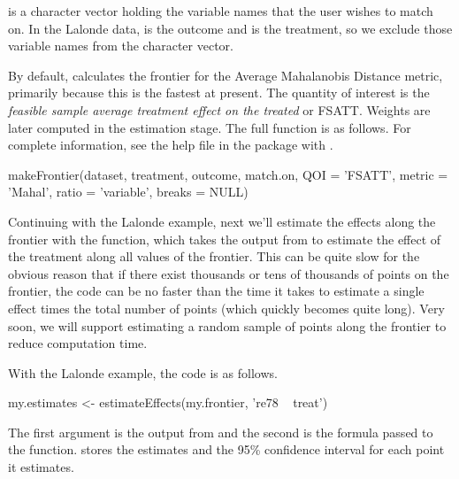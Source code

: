 \documentclass[nojss]{jss}
\begin{document}
 is a character vector holding the variable names that
the user wishes to match on. In the Lalonde data,  is the
outcome and  is the treatment, so we exclude those
variable names from the character vector.

By default,  calculates the frontier for the
Average Mahalanobis Distance metric, primarily because this is the
fastest at present. The quantity of interest is the \emph{feasible
  sample average treatment effect on the treated} or FSATT. Weights
are later computed in the estimation stage. The full function is as
follows.  For complete information, see the help file in the package
with .

\begin{CodeChunk}
\begin{CodeInput}
  makeFrontier(dataset, 
              treatment, 
              outcome, 
              match.on, QOI = 'FSATT',
              metric = 'Mahal', 
              ratio = 'variable', 
              breaks = NULL)
\end{CodeInput}
\end{CodeChunk}

Continuing with the Lalonde example, next we'll estimate the effects
along the frontier with the  function, which
takes the output from  to estimate the effect of
the treatment along all values of the frontier. This can be quite slow
for the obvious reason that if there exist thousands or tens of
thousands of points on the frontier, the code can be no faster than
the time it takes to estimate a single effect times the total number
of points (which quickly becomes quite long). Very soon, we will 
support estimating a random sample of points along the frontier to 
reduce computation time.

With the Lalonde example, the code is as follows. 

\begin{CodeChunk}
\begin{CodeInput}
my.estimates <- estimateEffects(my.frontier, 
                             're78 ~ treat')
\end{CodeInput}
\end{CodeChunk}

The first argument is the output from  and the
second is the formula passed to the 
function.  stores the estimates and the 95\%
confidence interval for each point it estimates.
\end{document}
